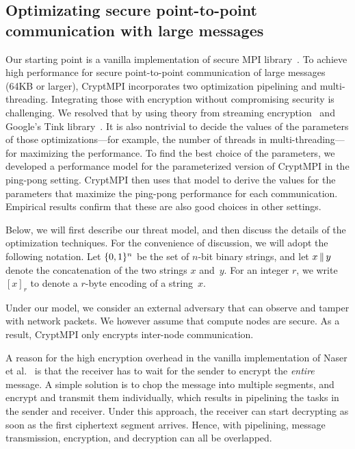 \subsection{Optimizating secure point-to-point communication with large messages}

Our starting point is a vanilla implementation of secure MPI
library~\cite{Cluster:Naser19}. To achieve high performance for secure
point-to-point communication of large messages (64KB or larger),
CryptMPI incorporates two optimization
pipelining and multi-threading. Integrating those with encryption without
compromising security is challenging. We resolved that by using theory from
streaming encryption~\cite{C:HRRV15} and Google's Tink library~\cite{tink}.
It is also nontrivial to decide the values of the parameters of those
optimizations---for example, the number of threads in multi-threading---for
maximizing the performance. To find the best choice of the parameters, we
developed a performance model for the parameterized version of CryptMPI in the
ping-pong setting.
CryptMPI then uses that model to derive the values for the parameters that
maximize the ping-pong performance for each communication.
Empirical results confirm that these are also good choices in
other settings.

Below, we will first describe our threat model,
and then discuss the details of the optimization techniques.
For the convenience of discussion,
we will adopt the following notation.
Let $\{0,1\}^n$ be the set of $n$-bit binary strings,
and let $x {\,\|\,} y$
denote the concatenation of the two strings $x$ and~$y$.
For an integer $r$, we write $[x]_r$ to denote a $r$-byte encoding
of a string~$x$.

Under our model, we consider an external
adversary that can observe and tamper with network packets.
We however assume that compute nodes are secure.
As a result, CryptMPI only encrypts inter-node communication.

A reason for the high encryption overhead in the vanilla
implementation of Naser et al.~\cite{Cluster:Naser19}
is that the receiver has to wait for the sender to
encrypt the \emph{entire} message. A simple solution is to chop the
message into multiple segments, and encrypt and transmit them individually, which
results in pipelining the tasks in  the sender and receiver.
Under this approach, the receiver can start decrypting as soon as the
first ciphertext segment arrives. Hence, with pipelining, message transmission,
encryption, and decryption can all be overlapped.

